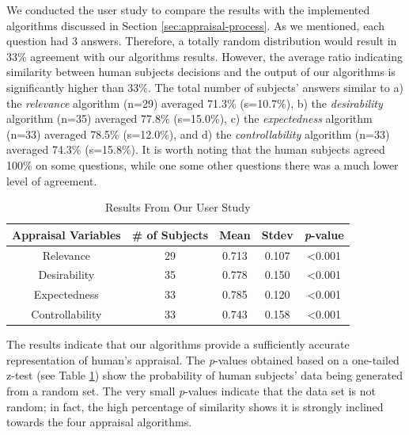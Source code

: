 \documentclass{aamas2016}
\begin{document}
\vspace*{-2mm}
We conducted the user study to compare the results with the implemented
algorithms discussed in Section \ref{sec:appraisal-process}. As we mentioned,
each question had 3 answers. Therefore, a totally random distribution would
result in 33\% agreement with our algorithms results. However, the average
ratio indicating similarity between human subjects decisions and the output of
our algorithms is significantly higher than 33\%. The total number of subjects'
answers similar to a) the \textit{relevance} algorithm (n=29) averaged 71.3\%
(s=10.7\%), b) the \textit{desirability} algorithm (n=35) averaged 77.8\%
(s=15.0\%), c) the \textit{expectedness} algorithm (n=33) averaged 78.5\%
(s=12.0\%), and d) the \textit{controllability} algorithm (n=33) averaged 74.3\%
(s=15.8\%). It is worth noting that the human subjects agreed 100\% on some
questions, while one some other questions there was a much lower level of
agreement.

\begin{table}
\centering
\caption{Results From Our User Study}
\begin{tabular}{|c|c|c|c|c|} \hline
{\fontsize{7.5}{8}\selectfont Appraisal Variables} &
{\fontsize{7.5}{8}\selectfont \# of Subjects} & {\fontsize{8}{8}\selectfont
Mean} & {\fontsize{7.5}{8}\selectfont Stdev} &
{\fontsize{7.5}{8}\selectfont\textit{p}-value}\\ \hline 
{\fontsize{7.5}{8}\selectfont Relevance} & 29 & 0.713 & 0.107 & <0.001\\ \hline
{\fontsize{7.5}{8}\selectfont Desirability} & 35 & 0.778 & 0.150 & <0.001\\
\hline 
{\fontsize{7.5}{8}\selectfont Expectedness} & 33 & 0.785 & 0.120 & <0.001\\
\hline 
{\fontsize{7.5}{8}\selectfont Controllability} & 33 & 0.743 & 0.158 & <0.001\\
\hline
\end{tabular}
\label{tbl:statistics}
\vspace*{-7mm}
\end{table}

The results indicate that our algorithms provide a sufficiently accurate
representation of human's appraisal. The \textit{p}-values obtained based on a
one-tailed z-test (see Table \ref{tbl:statistics}) show the probability of
human subjects' data being generated from a random set. The very small
\textit{p}-values indicate that the data set is not random; in fact, the high
percentage of similarity shows it is strongly inclined towards the four
appraisal algorithms.
\end{document}
